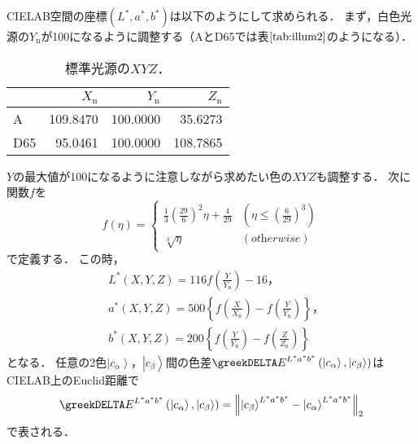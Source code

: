 \documentclass[uplatex,paper=a4,fontsize=4.0truemm,jafontsize=4.0truemm,head_space=30.0truemm,foot_space=30.0truemm,baselineskip=8.0truemm,line_length=40zw,gutter=25.0truemm,oneside,openany,fleqn,hanging_panctuation,open_bracket_pos=nibu_tentsuki,dvipdfmx,jis2004,book,titlepage]{jlreq}
\theoremstyle{mystyle}
\newcommand{\captiondot}[1]{\caption{#1．}}
\newcommand{\tableinput}[4]{\begin{table}[btp]\centering\captiondot{#3}\label{tab:#4}\begin{tabular}{#1}#2\end{tabular}\end{table}}
\newcommand{\mathdisplaystyle}[1]{\(\displaystyle{#1}\)}
\newcommand{\Reference}[1]{\mathdisplaystyle{\ref{#1}}}
\newcommand{\fraction}[2]{\displaystyle{\frac{\displaystyle{#1}}{\displaystyle{#2}}}}
\newcommand{\parentheses}[1]{\left(#1\right)}
\newcommand{\braces}[1]{\left\{#1\right\}}
\newcommand{\norm}[2]{{\left\lVert#1\right\rVert}_{#2}}
\newcommand{\Diracket}[1]{\left\lvert#1\right\rangle}
\begin{document}
			CIELAB空間の座標\mathdisplaystyle{\parentheses{L^\ast,a^\ast,b^\ast}}は以下のようにして求められる．
			まず，白色光源の\mathdisplaystyle{Y_\textrm{n}}が100になるように調整する（AとD65では表\Reference{tab:illum2}のようになる）．
			\tableinput{l|rrr}{ & \(X_\textrm{n}\) & \(Y_\textrm{n}\) & \(Z_\textrm{n}\) \\ \hline
				A & 109.8470 & 100.0000 & 35.6273 \\
				D65 & 95.0461 & 100.0000 & 108.7865}{標準光源の\mathdisplaystyle{XYZ}}{illum2}
			\mathdisplaystyle{Y}の最大値が100になるように注意しながら求めたい色の\mathdisplaystyle{XYZ}も調整する．
			次に関数\mathdisplaystyle{f}を
			\begin{equation*}
				f\parentheses{\eta}=\begin{cases}
					\fraction{1}{3}\parentheses{\fraction{29}{6}}^2\eta+\fraction{4}{29} & \parentheses{\eta\leq\parentheses{\fraction{6}{29}}^3} \\
					\sqrt[3]{\eta} & \parentheses{\textit{otherwise}}
				\end{cases}
			\end{equation*}
			で定義する．
			この時，
			\begin{align*}
				&L^\ast\parentheses{X,Y,Z}=116f\parentheses{\fraction{Y}{Y_\textrm{n}}}-16\textrm{，}\\
				&a^\ast\parentheses{X,Y,Z}=500\braces{f\parentheses{\fraction{X}{X_\textrm{n}}}-f\parentheses{\fraction{Y}{Y_\textrm{n}}}}\textrm{，}\\
				&b^\ast\parentheses{X,Y,Z}=200\braces{f\parentheses{\fraction{Y}{Y_\textrm{n}}}-f\parentheses{\fraction{Z}{Z_\textrm{n}}}}
			\end{align*}
			となる．
			任意の2色\mathdisplaystyle{\Diracket{c_\alpha}}，\mathdisplaystyle{\Diracket{c_\beta}}間の色差\mathdisplaystyle{\greekDELTA E^{L^\ast a^\ast b^\ast}\parentheses{\Diracket{c_\alpha},\Diracket{c_\beta}}}はCIELAB上のEuclid距離で
			\begin{equation}
				\greekDELTA E^{L^\ast a^\ast b^\ast}\parentheses{\Diracket{c_\alpha},\Diracket{c_\beta}}=\norm{\Diracket{c_\beta}^{L^\ast a^\ast b^\ast}-\Diracket{c_\alpha}^{L^\ast a^\ast b^\ast}}{2}\label{eq:LAB}
			\end{equation}
			で表される．
\end{document}
